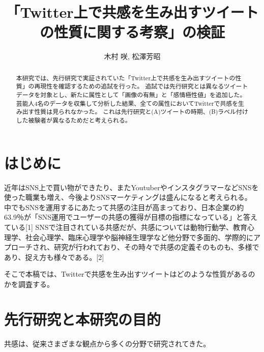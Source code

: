 \documentclass[dvipdfmx]{issj}
\title{「Twitter上で共感を生み出すツイートの性質に関する考察」の検証}
\author{木村 咲\uddag, 松澤芳昭\uddag}
\affiliation{\dag 青山学院大学　社会情報情報学部\ddag }
\begin{document}
\maketitle
\begin{abstract}
本研究では、先行研究で実証されていた「Twitter上で共感を生み出すツイートの性質」の再現性を確認するための追試を行った。 追試では先行研究とは異なるツイートデータを対象とし、新たに属性として「画像の有無」と「感情極性値」を追加した。 芸能人4名のデータを収集して分析した結果、全ての属性においてTwitterで共感を生み出す性質は見られなかった。 これは先行研究と(A)ツイートの時期、(B)ラベル付けした被験者が異なるためだと考えられる。
\end{abstract}
\section{はじめに} %

近年はSNS上で買い物ができたり、またYoutuberやインスタグラマーなどSNSを使った職業も増え、今後よりSNSマーケティングは盛んになると考えられる。
中でもSNSを運用するにあたって共感の注目が高まっており、日本企業の約63.9％が「SNS運用でユーザーの共感の獲得が目標の指標になっている」と答えている[1]
SNSで注目されている共感だが、共感については動物行動学、教育心理学、社会心理学、臨床心理学や脳神経生理学など他分野で多面的、学際的にアプローチされ、研究が行われており、その時々で共感の定義そのものも、多様であり、捉え方も様々である。[2]

そこで本稿では、Twitterで共感を生み出すツイートはどのような性質があるのかを調査する。





\section{先行研究と本研究の目的}  %

共感は、従来さまざまな観点から多くの分野で研究されてきた。
\end{document}
